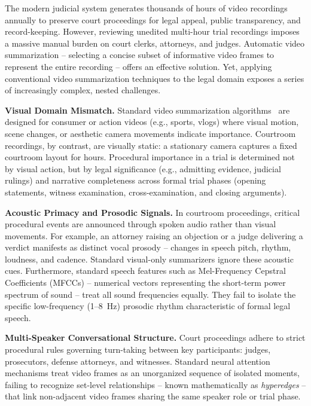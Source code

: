 \documentclass[letterpaper]{article}
\begin{document}
The modern judicial system generates thousands of hours of video recordings annually to preserve court proceedings for legal appeal, public transparency, and record-keeping. However, reviewing unedited multi-hour trial recordings imposes a massive manual burden on court clerks, attorneys, and judges. Automatic video summarization -- selecting a concise subset of informative video frames to represent the entire recording -- offers an effective solution. Yet, applying conventional video summarization techniques to the legal domain exposes a series of increasingly complex, nested challenges.

\textbf{Visual Domain Mismatch.} Standard video summarization algorithms~\cite{zhang2016video,mahasseni2017unsupervised} are designed for consumer or action videos (e.g., sports, vlogs) where visual motion, scene changes, or aesthetic camera movements indicate importance. Courtroom recordings, by contrast, are visually static: a stationary camera captures a fixed courtroom layout for hours. Procedural importance in a trial is determined not by visual action, but by legal significance (e.g., admitting evidence, judicial rulings) and narrative completeness across formal trial phases (opening statements, witness examination, cross-examination, and closing arguments).

\textbf{Acoustic Primacy and Prosodic Signals.} In courtroom proceedings, critical procedural events are announced through spoken audio rather than visual movements. For example, an attorney raising an objection or a judge delivering a verdict manifests as distinct vocal prosody -- changes in speech pitch, rhythm, loudness, and cadence. Standard visual-only summarizers ignore these acoustic cues. Furthermore, standard speech features such as Mel-Frequency Cepstral Coefficients (MFCCs) -- numerical vectors representing the short-term power spectrum of sound -- treat all sound frequencies equally. They fail to isolate the specific low-frequency (1--8~Hz) prosodic rhythm characteristic of formal legal speech.

\textbf{Multi-Speaker Conversational Structure.} Court proceedings adhere to strict procedural rules governing turn-taking between key participants: judges, prosecutors, defense attorneys, and witnesses. Standard neural attention mechanisms treat video frames as an unorganized sequence of isolated moments, failing to recognize set-level relationships -- known mathematically as \textit{hyperedges} -- that link non-adjacent video frames sharing the same speaker role or trial phase.
\end{document}
